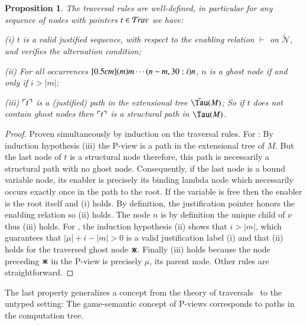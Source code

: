 \documentclass{elsarticle}
\def\shortproof{\begin{proof}}
\def\endshortproof{\end{proof}}
\theoremstyle{plain}
\newtheorem{proposition}[theorem]{Proposition}
\theoremstyle{definition}
\newcommand\Nodes{\mathcal{N}}%
\newcommand{\ghostvar}{\mathsf{x\mkern-5mu x}}
\newcommand\ExtendedNodes{\tilde{\Nodes}}
\newcommand{\enables}{\vdash} %
\newcommand{\ctree}{\Tau} %
\newcommand{\exttree}{\tilde{\Tau}} %
\newcommand{\ExternalNodes}{\Nodes^{\sf ext}}
\begin{document}
\begin{proposition}
\label{prop:ulctrav_welldefined_pathview}
The traversal rules are well-defined, in particular for any sequence of nodes with pointers $t\in \mathcal{T}\!rav$ we have:
\begin{compactitem}
\item[(i)] $t$ is a valid justified sequence, with respect to
the enabling relation $\enables$ on $\ExtendedNodes$, and verifies the alternation condition;
\item[(ii)] For all occurrences $\Pstr[0.5cm]{(m){m} \cdots (n-m,30:i){n}}$, $n$ is a ghost node if and only if $i > |m|$;
\item[(iii)] $\ulcorner t \urcorner$ is a (justified) path in the extensional tree $\exttree(M)$;
So if $t$ does not contain ghost nodes then $\ulcorner t \urcorner$ is a structural path in $\ctree(M)$.
\end{compactitem}
\end{proposition}
\shortproof
Proven simultaneously by induction on the traversal rules.
For : By induction hypothesis (iii) the P-view is a path in the extensional tree of $M$. But the last node of $t$ is a structural node therefore, this path is necessarily a structural path with no ghost node. Consequently, if the last node is a bound variable node, its enabler is precisely its binding lambda node which necessarily occurs exactly once in the path to the root. If the variable is free then the enabler is the root itself and (i) holds. By definition, the justification pointer honors the enabling relation so (ii) holds. The node $n$ is by definition the unique child of $\nu$ thus (iii) holds.
%
For \rulenamet{Lam^\ghostvar}, the induction hypothesis (ii) shows that $i>|m|$, which guarantees that $|\mu|+i-|m|>0$ is a valid justification label (i) and that (ii) holds for the traversed ghost node $\ghostvar$.
Finally (iii) holds because the node preceding $\ghostvar$ in the P-view is precisely $\mu$, its parent node.
%
Other rules are straightforward.
\endshortproof

The last property generalizes a concept from the theory of traversals~\cite{OngLics2006,BlumPhd} to the untyped setting: The game-semantic concept of P-views corresponds to paths in the computation tree.
\end{document}
